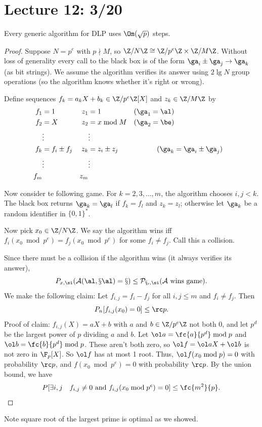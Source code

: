 \section{Lecture 12: 3/20}
\begin{cor}
Every generic algorithm for DLP uses $\Om(\sqrt p)$ steps.
\end{cor}
\begin{proof}
Suppose $N=p^e$ with $p\nmid M$, so $\Z/N\Z \cong \Z/p^e\Z\times \Z/M\Z$. Without loss of generality every call to the black box is of the form $\ga_i\pm \ga_j\to \ga_k$ (as bit strings). We assume the algorithm verifies its answer using $2\lg N$ group operations (so the algorithm knows whether it's right or wrong). %

Define sequences $f_k=a_kX+b_k\in \Z/p^e\Z[X]$ and $z_k\in \Z/M\Z$ by
\begin{align*}
f_1&=1 & z_1&=1 &(\ga_1=\al)\\
f_2&=X & z_2&=x\bmod M &(\ga_2=\be)\\
&\vdots &&\vdots &\\
f_k&=f_i\pm f_j & z_k&=z_i\pm z_j & (\ga_k&=\ga_i\pm \ga_j)\\
&\vdots &&\vdots &\\
f_m & & z_m & &
\end{align*}

Now consider te following game. For $k=2,3,\ldots, m$, the algorithm chooses $i,j<k$. The black box returns $\ga_k=\ga_l$ if $f_k=f_l$ and $z_k=z_l$; otherwise let $\ga_k$ be a random identifier in $\{0,1\}^*$.

Now pick $x_0\in\Z/N\Z$. We say the algorithm wins iff $f_i(x_0\bmod{p^e})=f_j(x_0\bmod{p^e})$ for some $f_i\ne f_j$. Call this a collision. %

Since there must be a collision if the algorithm wins (it always verifies its answer),
\[
P_{x,\si}(\cal A(\al,x\al)=x)\le P_{x_0,\si}(\cal A\text{ wins game}).
\]
We make the following claim: Let $f_{i,j}=f_i-f_j$ for all $i,j\le m$ and $f_i\ne f_j$. Then
\[
P_n[f_{i,j}(x_0)=0]\le \rc p.
\]
Proof of claim: $f_{i,j}(X)=aX+b$ with $a$ and $b\in \Z/p^e\Z$ not both 0, and let $p^d$ be the largest power of $p$ dividing $a$ and $b$. Let $\ol a=\fc{a}{p^d}\bmod p$ and $\ol b=\fc{b}{p^d}\bmod p$. These aren't both zero, so $\ol f=\ol a X+\ol b$ is not zero in $\F_p[X]$. So $\ol f$ has at most 1 root. Thus, $\ol f(x_0\bmod p)=0$ with probability $\rc p$, and $f(x_0\bmod{p^e})=0$ with probability $\rc p$. By the union bound, we have
\[
P[\exists i,j\quad f_{i,j}\ne 0 \text{ and }f_{i,j}(x_0\bmod{p^e})=0]\le \fc{m^2}{p}.
\]
\end{proof}
Note square root of the largest prime is optimal as we showed.


